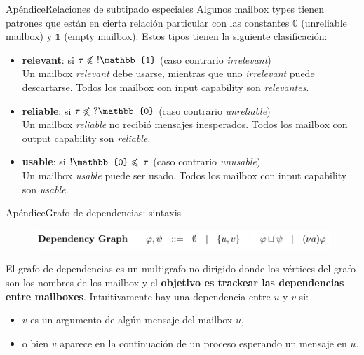 \documentclass{beamer}
\begin{document}
\begin{frame}{Apéndice}{Relaciones de subtipado especiales}
    Algunos mailbox types tienen patrones que están en cierta relación particular con las constantes $\mathbb{0}$ (unreliable mailbox) y $\mathbb{1}$ (empty mailbox). Estos tipos tienen la siguiente clasificación:
    \vspace{1em}

    \begin{itemize}
        \item \textbf{relevant}: si $\tau \not\leqslant \hspace{0.3em} !\mathbb{1}$ (caso contrario \emph{irrelevant})
        \\ Un mailbox \emph{relevant} debe usarse, mientras que uno \emph{irrelevant} puede descartarse. Todos los mailbox con input capability son \emph{relevantes}.
        \item \textbf{reliable}: si $\tau \not\leqslant \hspace{0.3em} ?\mathbb{0}$ (caso contrario \emph{unreliable})
        \\ Un mailbox \emph{reliable} no recibió mensajes inesperados. Todos los mailbox con output capability son \emph{reliable}.
        \item \textbf{usable}: si $!\mathbb{0} \not\leqslant \hspace{0.2em} \tau$ (caso contrario \emph{unusable})
        \\ Un mailbox \emph{usable} puede ser usado. Todos los mailbox con input capability son \emph{usable}.
    \end{itemize}
\end{frame}

\begin{frame}{Apéndice}{Grafo de dependencias: sintaxis}
    \begin{figure}[H]
        \includegraphics[width=\textwidth]{dependency-graph-syntax}
    \end{figure}

    El grafo de dependencias es un multigrafo no dirigido donde los vértices del grafo son los nombres de los mailbox y el \textbf{objetivo es trackear las dependencias entre mailboxes}. Intuitivamente hay una dependencia entre $u$ y $v$ si:
    \vspace{1em}

    \begin{itemize}
        \item $v$ es un argumento de algún mensaje del mailbox $u$,
        \item o bien $v$ aparece en la continuación de un proceso esperando un mensaje en $u$.
    \end{itemize}
\end{frame}
\end{document}
